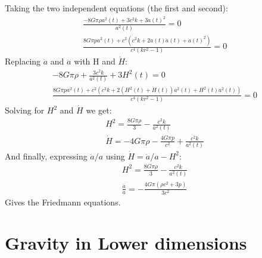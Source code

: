 \documentclass{article}
\begin{document}
Taking the two independent equations (the first and second):
\begin{equation}
\begin{gathered}
    \frac{- 8 G \pi \rho a^{2}{\left(t \right)} + 3 c^{2} k + 3 \dot{a}(t)^{2}}{a^{2}{\left(t \right)}} = 0
    \\
    \frac{8 G \pi p a^{2}{\left(t \right)} + c^{2} \left(c^{2} k + 2 a{\left(t \right)} \ddot{a}(t) + \dot{a}(t)^{2}\right)}{c^{4} \left(k r^{2} - 1\right)} = 0       
\end{gathered}
\end{equation}
Replacing $\dot{a}$ and $\ddot{a}$ with H and $\dot{H}$:
\begin{equation}
\begin{gathered} 
    - 8 G \pi \rho + \frac{3 c^{2} k}{a^{2}{\left(t \right)}} + 3 H^{2}{\left(t \right)} = 0
    \\
    \frac{8 G \pi p a^{2}{\left(t \right)} + c^{2} \left(c^{2} k + 2 \left(H^{2}{\left(t \right)} + \dot{H}(t)\right) a^{2}{\left(t \right)} + H^{2}{\left(t \right)} a^{2}{\left(t \right)}\right)}{c^{4} \left(k r^{2} - 1\right)} = 0
\end{gathered}
\end{equation}
Solving for $H^2$ and $\dot{H}$ we get:
\begin{equation}
\begin{gathered}
    H^2 = \frac{8 G \pi \rho}{3} - \frac{c^{2} k}{a^{2}{\left(t \right)}}
    \\
    \dot{H} = - 4 G \pi \rho - \frac{4 G \pi p}{c^{2}} + \frac{c^{2} k}{a^{2}{\left(t \right)}}
\end{gathered}
\end{equation}
And finally, expressing $\ddot{a}/a$ using $\dot{H} = \ddot{a}/a - H^2$:
\begin{equation}
\begin{gathered}
    H^2 = \frac{8 G \pi \rho}{3} - \frac{c^{2} k}{a^{2}{\left(t \right)}}
    \\
    \frac{\ddot{a}}{a} = - \frac{4 G \pi \left(\rho c^{2} + 3 p\right)}{3 c^{2}}
\end{gathered}
\end{equation}
Gives the Friedmann equations.

\section{Gravity in Lower dimensions}
\end{document}
